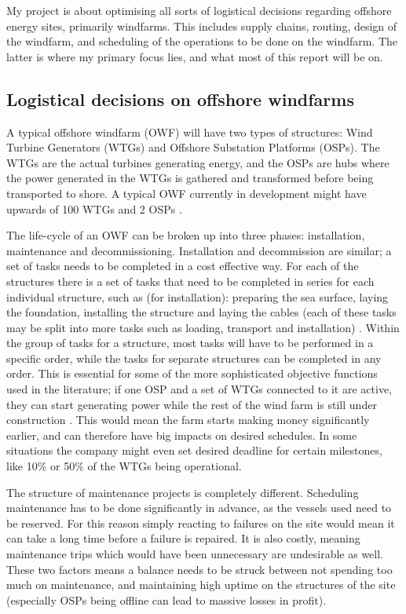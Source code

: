 \documentclass[a4paper,12pt]{article}
\begin{document}
My project is about optimising all sorts of logistical decisions regarding offshore energy sites, primarily windfarms. This includes supply chains, routing, design of the windfarm, and scheduling of the operations to be done on the windfarm. The latter is where my primary focus lies, and what most of this report will be on. 

\subsection{Logistical decisions on offshore windfarms} \label{ss:logdec}
A typical offshore windfarm (OWF) will have two types of structures: Wind Turbine Generators (WTGs) and Offshore Substation Platforms (OSPs). The WTGs are the actual turbines generating energy, and the OSPs are hubs where the power generated in the WTGs is gathered and transformed before being transported to shore. A typical OWF currently in development might have upwards of 100 WTGs and 2 OSPs \cite{ruk2017, barlow2018mixed}. 

The life-cycle of an OWF can be broken up into three phases: installation, maintenance and decommissioning. Installation and decommission are similar; a set of tasks needs to be completed in a cost effective way. For each of the structures there is a set of tasks that need to be completed in series for each individual structure, such as (for installation): preparing the sea surface, laying the foundation, installing the structure and laying the cables (each of these tasks may be split into more tasks such as loading, transport and installation) \cite{kerkhove2017optimised}. Within the group of tasks for a structure, most tasks will have to be performed in a specific order, while the tasks for separate structures can be completed in any order. This is essential for some of the more sophisticated objective functions used in the literature; if one OSP and a set of WTGs connected to it are active, they can start generating power while the rest of the wind farm is still under construction \cite{barlow2017using}. This would mean the farm starts making money significantly earlier, and can therefore have big impacts on desired schedules. In some situations the company might even set desired deadline for certain milestones, like 10\% or 50\% of the WTGs being operational. 

The structure of maintenance projects is completely different. Scheduling maintenance has to be done significantly in advance, as the vessels used need to be reserved. For this reason simply reacting to failures on the site would mean it can take a long time before a failure is repaired. It is also costly, meaning maintenance trips which would have been unnecessary are undesirable as well. These two factors means a balance needs to be struck between not spending too much on maintenance, and maintaining high uptime on the structures of the site (especially OSPs being offline can lead to massive losses in profit). 
\end{document}
